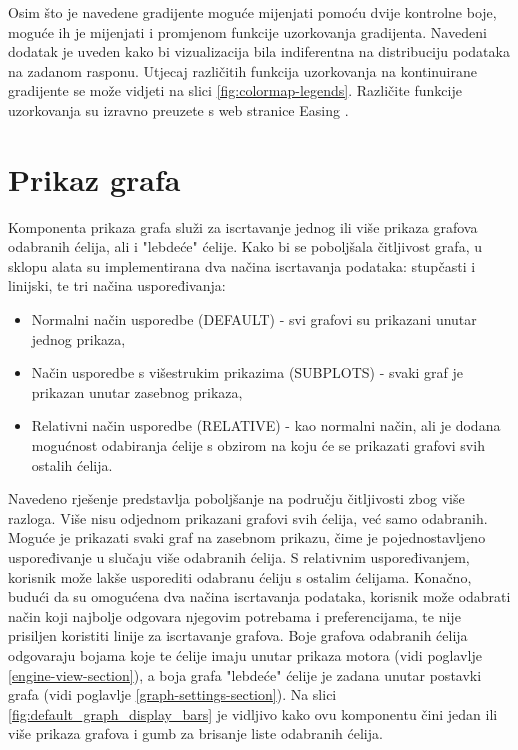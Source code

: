 \documentclass[times, utf8, diplomski]{fer}
\begin{document}
Osim što je navedene gradijente moguće mijenjati pomoću dvije kontrolne boje, moguće ih je mijenjati i promjenom funkcije uzorkovanja gradijenta. Navedeni dodatak je uveden kako bi vizualizacija bila indiferentna na distribuciju podataka na zadanom rasponu. Utjecaj različitih funkcija uzorkovanja na kontinuirane gradijente se može vidjeti na slici \ref{fig:colormap-legends}. Različite funkcije uzorkovanja su izravno preuzete s web stranice Easing \citep{easing}.

\section{Prikaz grafa} \label{graph-view-section}

Komponenta prikaza grafa služi za iscrtavanje jednog ili više prikaza grafova odabranih ćelija, ali i "lebdeće" ćelije. Kako bi se poboljšala čitljivost grafa, u sklopu alata su implementirana dva načina iscrtavanja podataka: stupčasti i linijski, te tri načina uspoređivanja:
\begin{itemize}
\item Normalni način usporedbe (DEFAULT) - svi grafovi su prikazani unutar jednog prikaza,
\item Način usporedbe s višestrukim prikazima (SUBPLOTS) - svaki graf je prikazan unutar zasebnog prikaza,
\item Relativni način usporedbe (RELATIVE) - kao normalni način, ali je dodana mogućnost odabiranja ćelije s obzirom na koju će se prikazati grafovi svih ostalih ćelija.\\
\end{itemize}

Navedeno rješenje predstavlja poboljšanje na području čitljivosti zbog više razloga. Više nisu odjednom prikazani grafovi svih ćelija, već samo odabranih. Moguće je prikazati svaki graf na zasebnom prikazu, čime je pojednostavljeno uspoređivanje u slučaju više odabranih ćelija. S relativnim uspoređivanjem, korisnik može lakše usporediti odabranu ćeliju s ostalim ćelijama. Konačno, budući da su omogućena dva načina iscrtavanja podataka, korisnik može odabrati način koji najbolje odgovara njegovim potrebama i preferencijama, te nije prisiljen koristiti linije za iscrtavanje grafova. Boje grafova odabranih ćelija odgovaraju bojama koje te ćelije imaju unutar prikaza motora (vidi poglavlje \ref{engine-view-section}), a boja grafa "lebdeće" ćelije je zadana unutar postavki grafa (vidi poglavlje \ref{graph-settings-section}). Na slici \ref{fig:default_graph_display_bars} je vidljivo kako ovu komponentu čini jedan ili više prikaza grafova i gumb za brisanje liste odabranih ćelija.
\end{document}
